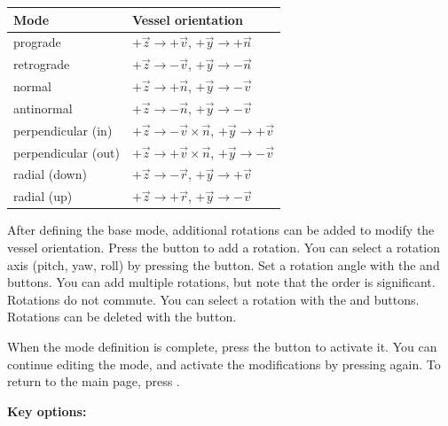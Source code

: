 \documentclass[Orbiter User Manual.tex]{subfiles}
\begin{document}
	\begin{longtable}{ p{} p{} }
	\hline
	\textbf{Mode} & \textbf{Vessel orientation}\\
	\hline
	prograde & $+\vec{z} \rightarrow +\vec{v}$, $+\vec{y} \rightarrow
		+\vec{n}$\\
	\hline
	retrograde & $+\vec{z} \rightarrow -\vec{v}$, $+\vec{y} \rightarrow
		-\vec{n}$\\
	\hline
	normal & $+\vec{z} \rightarrow +\vec{n}$, $+\vec{y} \rightarrow -\vec{v}$\\
	\hline
	antinormal & $+\vec{z} \rightarrow -\vec{n}$, $+\vec{y} \rightarrow
		-\vec{v}$\\
	\hline
	perpendicular (in) & $+\vec{z} \rightarrow -\vec{v} \times \vec{n}$,
		$+\vec{y} \rightarrow +\vec{v}$\\
	\hline
	perpendicular (out) & $+\vec{z} \rightarrow +\vec{v} \times \vec{n}$,
		$+\vec{y} \rightarrow -\vec{v}$\\
	\hline
	radial (down) & $+\vec{z} \rightarrow -\vec{r}$, $+\vec{y} \rightarrow
		+\vec{v}$\\
	\hline
	radial (up) & $+\vec{z} \rightarrow +\vec{r}$, $+\vec{y} \rightarrow
		-\vec{v}$\\
	\hline
	\end{longtable}

After defining the base mode, additional rotations can be added to modify the
vessel orientation. Press the  button to add a rotation. You can
select a rotation axis (pitch, yaw, roll) by pressing the  button.
Set a rotation angle with the  and  buttons. You can add
multiple rotations, but note that the order is significant. Rotations do not
commute. You can select a rotation with the  and  buttons.
Rotations can be deleted with the  button.

When the mode definition is complete, press the  button to activate
it. You can continue editing the mode, and activate the modifications by
pressing 
again. To return to the main page, press .

\textbf{Key options:}
\end{document}
